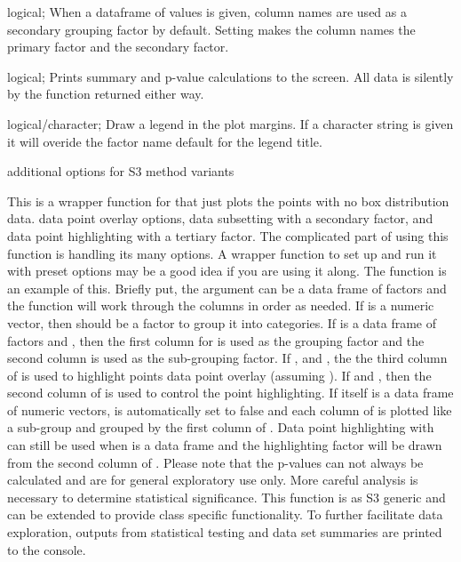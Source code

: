 \documentclass[a4paper]{book}
\begin{document}
\begin{Arguments}
\begin{ldescription}
\item[\code{flipFacts}] logical; When a dataframe of values is given, column names are used as a secondary grouping factor by default. Setting  makes the column names the primary factor and  the secondary factor.

\item[\code{verbose}] logical; Prints summary and p-value calculations to the screen. All data is silently by the function returned either way.

\item[\code{legend}] logical/character; Draw a legend in the plot margins. If a character string is given it will overide the factor name default for the legend title.

\item[\code{...}] additional options for S3 method variants
\end{ldescription}
\end{Arguments}
%
\begin{Details}\relax
This is a wrapper function for  that just plots the points with no box distribution data. data point overlay options, data subsetting with a secondary factor, and data point highlighting with a tertiary factor.
The complicated part of using this function is handling its many options. A wrapper function to set up and run it with preset options may be a good idea if you are using it along. The function  is an example of this.
Briefly put, the  argument can be a data frame of factors and the function will  work through the columns in order as needed.
If  is a numeric vector, then  should be a factor to group it into categories. If  is a data frame of factors and , then the first column for 
is used as the grouping factor and the second column is used as the sub-grouping factor. If , and , the the third column of 
is used to highlight points data point overlay (assuming ). If  and , then the second column of  is used to control
the point highlighting. If  itself is a data frame of numeric vectors,  is automatically set to false and each column of  is plotted like a sub-group and grouped
by the first column of . Data point highlighting with  can still be used when  is a data frame and the highlighting factor will be drawn from the second column of .
Please note that the p-values can not always be calculated and are for general exploratory use only. More careful analysis is necessary to determine statistical significance.
This function is as S3 generic and can be extended to provide class specific functionality.
To further facilitate data exploration, outputs from statistical testing and data set summaries
are printed to the console.
\end{Details}
\end{document}
